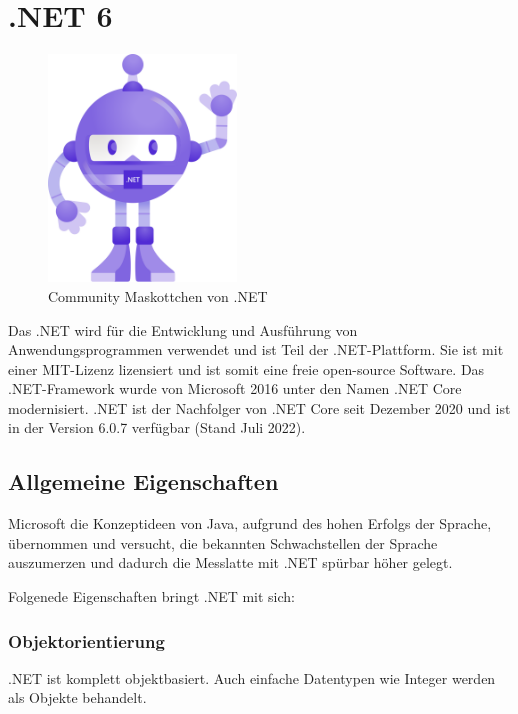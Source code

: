 \section{.NET 6}
\begin{figure}[h]
    \begin{center}
        \includegraphics*[width=5cm]{pics/Dotnet-bot.png}
        \caption[Community Maskottchen von .NET]{Community Maskottchen von .NET \cite{DotNetBot}}
    \end{center}
\end{figure}


\cite{CSharp8Rheinwerk}
\cite{DotNet6Documentation}
\cite{DotNet6Wikipedia}

Das .NET wird für die Entwicklung und Ausführung von Anwendungsprogrammen verwendet und ist Teil der .NET-Plattform.
Sie ist mit einer MIT-Lizenz lizensiert und ist somit eine freie open-source Software. Das .NET-Framework wurde von Microsoft 
2016 unter den Namen .NET Core modernisiert. .NET ist der Nachfolger von .NET Core seit Dezember 2020 und ist in der Version 6.0.7 verfügbar (Stand Juli 2022).

\subsection{Allgemeine Eigenschaften}
Microsoft die Konzeptideen von Java, aufgrund des hohen Erfolgs der Sprache,
übernommen und versucht, die bekannten Schwachstellen der Sprache auszumerzen und dadurch die Messlatte mit 
.NET spürbar höher gelegt.

Folgenede Eigenschaften bringt .NET mit sich:

\subsubsection{Objektorientierung}
.NET ist komplett objektbasiert. Auch einfache Datentypen wie Integer werden als Objekte behandelt.

